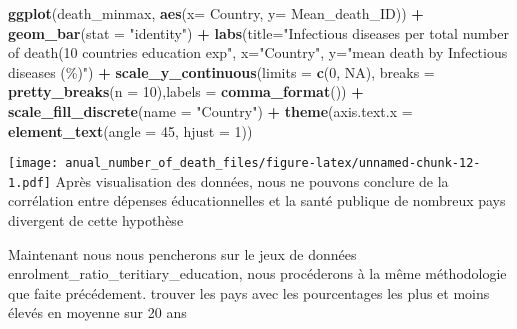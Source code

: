 \documentclass[
]{article}
\newenvironment{Shaded}{\begin{snugshade}}{\end{snugshade}}
\newcommand{\AttributeTok}[1]{\textcolor[rgb]{0.13,0.29,0.53}{#1}}
\newcommand{\ConstantTok}[1]{\textcolor[rgb]{0.56,0.35,0.01}{#1}}
\newcommand{\DecValTok}[1]{\textcolor[rgb]{0.00,0.00,0.81}{#1}}
\newcommand{\FunctionTok}[1]{\textcolor[rgb]{0.13,0.29,0.53}{\textbf{#1}}}
\newcommand{\NormalTok}[1]{#1}
\newcommand{\SpecialCharTok}[1]{\textcolor[rgb]{0.81,0.36,0.00}{\textbf{#1}}}
\newcommand{\StringTok}[1]{\textcolor[rgb]{0.31,0.60,0.02}{#1}}
\begin{document}
\begin{Shaded}
\begin{Highlighting}[]
\FunctionTok{ggplot}\NormalTok{(death\_minmax, }\FunctionTok{aes}\NormalTok{(}\AttributeTok{x=}\NormalTok{ Country, }\AttributeTok{y=} \StringTok{\textasciigrave{}}\AttributeTok{Mean\_death\_ID}\StringTok{\textasciigrave{}}\NormalTok{)) }\SpecialCharTok{+} \FunctionTok{geom\_bar}\NormalTok{(}\AttributeTok{stat =} \StringTok{"identity"}\NormalTok{) }\SpecialCharTok{+} \FunctionTok{labs}\NormalTok{(}\AttributeTok{title=}\StringTok{"Infectious diseases per total number of death(10 countries education exp"}\NormalTok{, }\AttributeTok{x=}\StringTok{"Country"}\NormalTok{, }\AttributeTok{y=}\StringTok{"mean death by Infectious diseases (\%)"}\NormalTok{) }\SpecialCharTok{+}  \FunctionTok{scale\_y\_continuous}\NormalTok{(}\AttributeTok{limits =} \FunctionTok{c}\NormalTok{(}\DecValTok{0}\NormalTok{, }\ConstantTok{NA}\NormalTok{), }\AttributeTok{breaks =} \FunctionTok{pretty\_breaks}\NormalTok{(}\AttributeTok{n =} \DecValTok{10}\NormalTok{),}\AttributeTok{labels =} \FunctionTok{comma\_format}\NormalTok{()) }\SpecialCharTok{+} \FunctionTok{scale\_fill\_discrete}\NormalTok{(}\AttributeTok{name =} \StringTok{"Country"}\NormalTok{) }\SpecialCharTok{+} 
  \FunctionTok{theme}\NormalTok{(}\AttributeTok{axis.text.x =} \FunctionTok{element\_text}\NormalTok{(}\AttributeTok{angle =} \DecValTok{45}\NormalTok{, }\AttributeTok{hjust =} \DecValTok{1}\NormalTok{)) }
\end{Highlighting}
\end{Shaded}

\texttt{[image: anual\_number\_of\_death\_files/figure-latex/unnamed-chunk-12-1.pdf]}
Après visualisation des données, nous ne pouvons conclure de la
corrélation entre dépenses éducationnelles et la santé publique de
nombreux pays divergent de cette hypothèse

Maintenant nous nous pencherons sur le jeux de données
enrolment\_ratio\_teritiary\_education, nous procéderons à la même
méthodologie que faite précédement. trouver les pays avec les
pourcentages les plus et moins élevés en moyenne sur 20 ans
\end{document}

